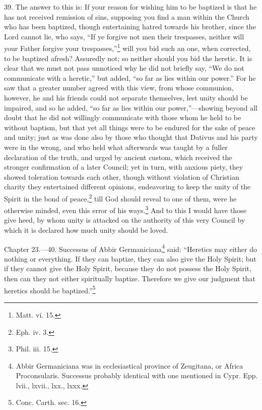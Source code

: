 39. The answer to this is: If your reason for wishing him to be baptized is that he has not received remission of sins, supposing you find a man within the Church who has been baptized, though entertaining hatred towards his brother, since the Lord cannot lie, who says, ``If ye forgive not men their trespasses, neither will your Father forgive your trespasses,''\footnote{\par  Matt. vi. 15.} will you bid such an one, when corrected, to be baptized afresh? Assuredly not; so neither should you bid the heretic. It is clear that we must not pass unnoticed why he did not briefly say, ``We do not communicate with a heretic,'' but added, ``so far as lies within our power.'' For he saw that a greater number agreed with this view, from whose communion, however, he and his friends could not separate themselves, lest unity should be impaired, and so he added, ``so far as lies within our power,''—showing beyond all doubt that he did not willingly communicate with those whom he held to be without baptism, but that yet all things were to be endured for the sake of peace and unity; just as was done also by those who thought that Dativus and his party were in the wrong, and who held what afterwards was taught by a fuller declaration of the truth, and urged by ancient custom, which received the stronger confirmation of a later Council; yet in turn, with anxious piety, they showed toleration towards each other, though without violation of Christian charity they entertained different opinions, endeavoring to keep the unity of the Spirit in the bond of peace,\footnote{\par  Eph. iv. 3.} till God should reveal to one of them, were he otherwise minded, even this error of his ways.\footnote{\par  Phil. iii. 15.} And to this I would have those give heed, by whom unity is attacked on the authority of this very Council by which it is declared how much unity should be loved.


Chapter 23.—40. Successus of Abbir Germaniciana\footnote{\par  Abbir Germaniciana was in ecclesiastical province of Zeugitana, or Africa Proconsularis. Successus probably identical with one mentioned in Cypr. Epp. lvii., lxvii., lxx., lxxx.} said: ``Heretics may either do nothing or everything. If they can baptize, they can also give the Holy Spirit; but if they cannot give the Holy Spirit, because they do not possess the Holy Spirit, then can they not either spiritually baptize. Therefore we give our judgment that heretics should be baptized.''\footnote{\par  Conc. Carth. sec. 16.}

